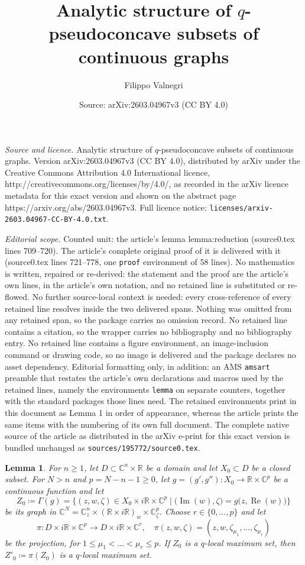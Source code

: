 \documentclass[10pt,a4paper]{amsart}
\title{Analytic structure of $q$-pseudoconcave subsets of continuous graphs}
\author{Filippo Valnegri}
\date{Source: arXiv:2603.04967v3 (CC BY 4.0)}
\newtheorem{lemma}{Lemma}
\newcommand{\C}{\numberset{C}}
\renewcommand{\Im}{\Impart}
\DeclareMathOperator{\Impart}{Im}
\newcommand{\R}{\numberset{R}}
\renewcommand{\Re}{\Realpart}
\DeclareMathOperator{\Realpart}{Re}
\newcommand{\numberset}{\mathbb}
\begin{document}
\maketitle

\noindent\emph{Source and licence.} Analytic structure of $q$-pseudoconcave subsets of continuous graphs. Version arXiv:2603.04967v3 (CC BY 4.0), distributed by arXiv under the Creative Commons Attribution 4.0 International licence, http://creativecommons.org/licenses/by/4.0/, as recorded in the arXiv licence metadata for this exact version and shown on the abstract page https://arxiv.org/abs/2603.04967v3. Full licence notice: \texttt{licenses/arxiv-2603.04967-CC-BY-4.0.txt}.\par\smallskip

\noindent\textit{Editorial scope.} Counted unit: the article's lemma lemma:reduction (source0.tex lines 709--720). The article's complete original proof of it is delivered with it (source0.tex lines 721--778, one \texttt{proof} environment of 58 lines). No mathematics is written, repaired or re-derived: the statement and the proof are the article's own lines, in the article's own notation, and no retained line is substituted or re-flowed.  No further source-local context is needed: every cross-reference of every retained line resolves inside the two delivered spans.  Nothing was omitted from any retained span, so the package carries no omission record.  No retained line contains a citation, so the wrapper carries no bibliography and no bibliography entry.  No retained line contains a figure environment, an image-inclusion command or drawing code, so no image is delivered and the package declares no asset dependency.  Editorial formatting only, in addition: an AMS \texttt{amsart} preamble that restates the article's own declarations and macros used by the retained lines, namely the environments \texttt{lemma} on separate counters, together with the standard packages those lines need.  The retained environments print in this document as Lemma 1 in order of appearance, whereas the article prints the same items with the numbering of its own full document.  The complete native source of the article as distributed in the arXiv e-print for this exact version is bundled unchanged as \texttt{sources/195772/source0.tex}.
\begin{lemma}
\label{lemma:reduction}
    For $n\geq1$, let $D\subset\C^n\times\R$ be a domain and let $X_0\subset D$ be a closed subset. For $N>n$ and $p=N-n-1\geq0$, let $g=(g',g''):X_0\to\R\times\C^p$ be a continuous function and let
    \[
        Z_0\coloneqq\Gamma(g)=\bigl\{(z,w,\zeta)\in X_0\times i\R\times\C^p \mid \bigl(\Im(w),\zeta\bigr)=g\bigl(z,\Re(w)\bigr)\bigr\}
    \]
    be its graph in $\C^N=\C^n_z\times(\R\times i\R)_w\times\C^p_\zeta$. Choose $r\in\{0,\dots,p\}$ and let
    \[
        \pi:D\times i\R\times\C^p\to D\times i\R\times\C^r, \quad \pi(z,w,\zeta)=(z,w,\zeta_{\mu_1},\dots,\zeta_{\mu_r})
    \]    
    be the projection, for $1\leq\mu_1<\dots<\mu_r\leq p$. If $Z_0$ is a $q$-local maximum set, then $Z'_0\coloneqq\pi(Z_0)$ is a $q$-local maximum set.
\end{lemma}
\end{document}
